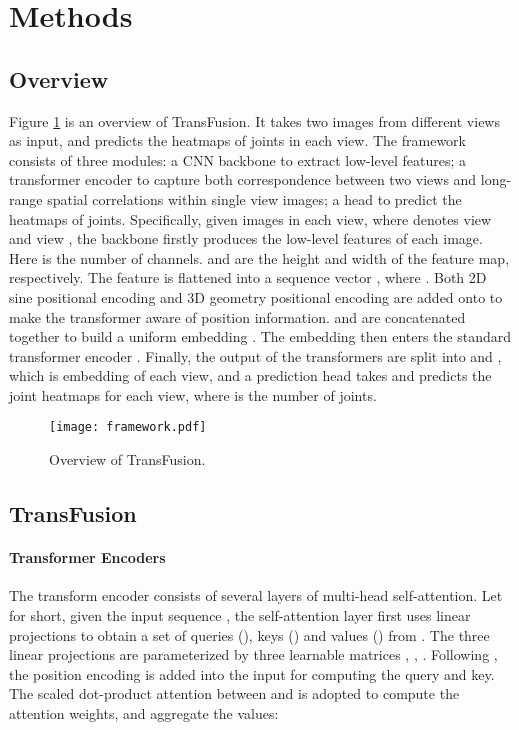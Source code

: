 \documentclass{bmvc2k}
\begin{document}
\vspace{-1.0 em}
\section{Methods}
\vspace{-0.8 em}
\subsection{Overview}
\vspace{-0.8em}
Figure \ref{fig:network} is an overview of TransFusion. 
It takes two images from different views as input, and predicts the heatmaps of joints in each view. The framework consists of three modules: a CNN backbone to extract low-level features; a transformer encoder to capture both correspondence between two views and long-range spatial correlations within single view images; a head to predict the heatmaps of joints. 
Specifically, given images  in each view, where  denotes view  and view , the backbone  firstly produces the low-level features  of each image. Here  is the number of channels.   and  are the height and width of the feature map, respectively. The feature  is flattened into a sequence vector , where . 
Both 2D sine positional encoding  and 3D geometry positional encoding  are added onto  to make the transformer aware of position information.  and  are concatenated together to build a uniform embedding . The embedding  then enters the standard transformer encoder . 
Finally, the output of the transformers  are split into  and , which is embedding of each view, and a prediction head  takes  and predicts the joint heatmaps  for each view, where  is the number of joints.   


\begin{figure}[!t]
    \centering
    \texttt{[image: framework.pdf]}
    \vspace{-1 em}
    \caption{\footnotesize{Overview of TransFusion. }}
    \label{fig:network}
\end{figure}



\vspace{-1.0em}
\subsection{TransFusion}
\vspace{-0.5em}
\paragraph{Transformer Encoders}
The transform encoder  consists of several layers of multi-head self-attention. 
Let  for short, given the input sequence , the self-attention layer first uses linear projections to obtain a set of queries (), keys () and values () from . The three linear projections are parameterized by three learnable matrices ,  , .
Following \cite{carion2020end}, the position encoding  is added into the input  for computing the query and key. 
The scaled dot-product attention \cite{vaswani2017attention} between  and  is adopted to compute the attention weights, and aggregate the values: 
\end{document}

